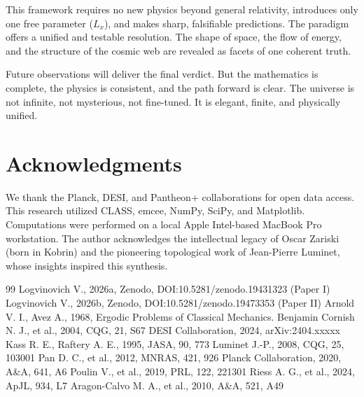 \documentclass[12pt,a4paper]{article}
\begin{document}
This framework requires no new physics beyond general relativity, introduces only one free parameter ($L_x$), and makes sharp, falsifiable predictions. The paradigm offers a unified and testable resolution. The shape of space, the flow of energy, and the structure of the cosmic web are revealed as facets of one coherent truth.

Future observations will deliver the final verdict. But the mathematics is complete, the physics is consistent, and the path forward is clear. The universe is not infinite, not mysterious, not fine-tuned. It is elegant, finite, and physically unified.

\section*{Acknowledgments}
We thank the Planck, DESI, and Pantheon+ collaborations for open data access. This research utilized CLASS, emcee, NumPy, SciPy, and Matplotlib. Computations were performed on a local Apple Intel-based MacBook Pro workstation. The author acknowledges the intellectual legacy of Oscar Zariski (born in Kobrin) and the pioneering topological work of Jean-Pierre Luminet, whose insights inspired this synthesis.

\begin{thebibliography}{99}
 Logvinovich V., 2026a, Zenodo, DOI:10.5281/zenodo.19431323 (Paper I)
 Logvinovich V., 2026b, Zenodo, DOI:10.5281/zenodo.19473353 (Paper II)
 Arnold V. I., Avez A., 1968, Ergodic Problems of Classical Mechanics. Benjamin
 Cornish N. J., et al., 2004, CQG, 21, S67
 DESI Collaboration, 2024, arXiv:2404.xxxxx
 Kass R. E., Raftery A. E., 1995, JASA, 90, 773
 Luminet J.-P., 2008, CQG, 25, 103001
 Pan D. C., et al., 2012, MNRAS, 421, 926
 Planck Collaboration, 2020, A\&A, 641, A6
 Poulin V., et al., 2019, PRL, 122, 221301
 Riess A. G., et al., 2024, ApJL, 934, L7
 Aragon-Calvo M. A., et al., 2010, A\&A, 521, A49
\end{thebibliography}
\end{document}
